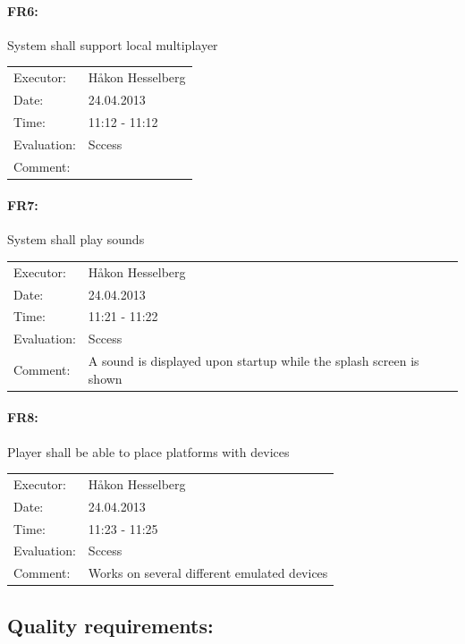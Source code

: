 \documentclass[12pt, a4paper]{article}
\begin{document}
\paragraph{FR6:} System shall support local multiplayer\\
\begin{tabular}{  p{}  p{} }
    Executor: & Håkon Hesselberg  \\
    Date: & 24.04.2013 \\
    Time: & 11:12 - 11:12  \\
    Evaluation: & Sccess \\
	Comment: &

\end{tabular}

\paragraph{FR7:} System shall play sounds\\
\begin{tabular}{  p{}  p{} }
    Executor: & Håkon Hesselberg  \\
    Date: & 24.04.2013 \\
    Time: & 11:21 - 11:22  \\
    Evaluation: & Sccess \\
	Comment: &
A sound is displayed upon startup while the splash screen is shown\\
\end{tabular}

\paragraph{FR8:} Player shall be able to place platforms with devices\\
\begin{tabular}{  p{}  p{} }
    Executor: & Håkon Hesselberg  \\
    Date: & 24.04.2013 \\
    Time: & 11:23 - 11:25  \\
    Evaluation: & Sccess \\
	Comment: &
Works on several different emulated devices \\
\end{tabular}

\subsection{Quality requirements:}
\end{document}
